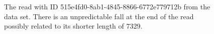 \begin{figure}
\centering

	\caption{\label{fig:read-515}The read with ID 515e4fd0-8ab1-4845-8866-6772e779712b from the data set. There is an unpredictable fall at the end of the read possibly related to its shorter length of 7329.}
\end{figure}
